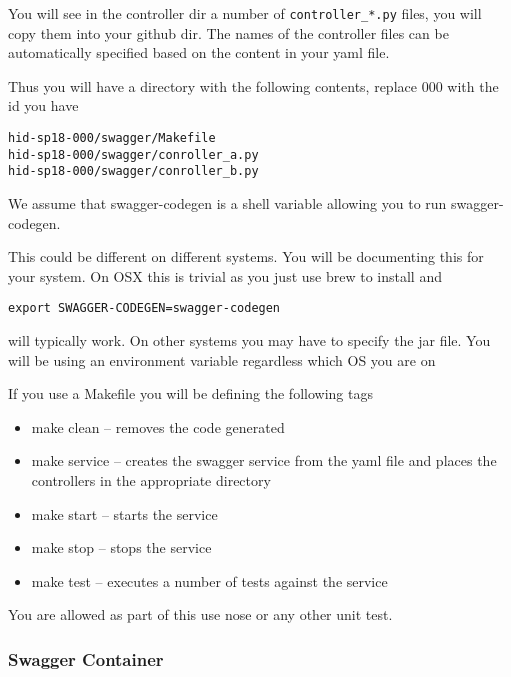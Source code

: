 \begin{exercise}
You will see in the controller dir a number of \verb|controller_*.py|
files, you will copy them into your github dir. The names of the
controller files can be automatically specified based on the content
in your yaml file.

 

Thus you will have a directory with the following contents, replace
000 with the id you have

 
\begin{lstlisting}
hid-sp18-000/swagger/Makefile
hid-sp18-000/swagger/conroller_a.py
hid-sp18-000/swagger/conroller_b.py
\end{lstlisting}
 

We assume that swagger-codegen is a shell variable allowing you to run
swagger-codegen.

This could be different on different systems. You will be documenting
this for your system. On OSX this is trivial as you just use brew to
install and

\begin{lstlisting}
export SWAGGER-CODEGEN=swagger-codegen
\end{lstlisting}
 
will typically work. On other systems you may have to specify the jar
file. You will be using an environment variable regardless which OS
you are on

If you use a Makefile you will be defining the following tags

 
\begin{itemize}
\item make clean -- removes the code generated

\item make service -- creates the swagger service from the yaml file
  and places the controllers in the appropriate directory

\item make start  -- starts the service

\item make stop -- stops the service

\item make test -- executes a number of tests against the service
\end{itemize}

You are allowed as part of this use nose or any other unit test. 

\end{exercise}

\subsubsection{Swagger Container}

